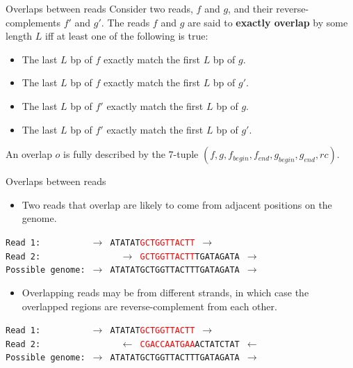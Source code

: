 \documentclass[xcolor=dvipsnames]{beamer}
\newcommand{\LengthVar}{L}
\begin{document}
\begin{frame}{Overlaps between reads}
	Consider two reads, $f$ and $g$, and their reverse-complements $f'$ and $g'$.
	The reads $f$ and $g$ are said to {\bf exactly overlap} by some length
	$\LengthVar$ iff at least one of the following is true:
	\begin{itemize}
		\item The last $\LengthVar$ bp of $f$ exactly match the first
		$\LengthVar$ bp of $g$.
		\item The last $\LengthVar$ bp of $f$ exactly match the first
		$\LengthVar$ bp of $g'$.
		\item The last $\LengthVar$ bp of $f'$ exactly match the first
		$\LengthVar$ bp of $g$.
		\item The last $\LengthVar$ bp of $f'$ exactly match the first
		$\LengthVar$ bp of $g'$.
	\end{itemize}
	An overlap $o$ is fully described by the 7-tuple $(f, g, f_{begin}, f_{end},
	g_{begin}, g_{end}, rc)$.
\end{frame}

\begin{frame}{Overlaps between reads}

	\begin{itemize}
	\item Two reads that overlap are likely to come from adjacent positions on the genome.
	\end{itemize}

	{\tt Read 1: \ \ \ \ \ \ \ \ \ $\rightarrow$
		ATATAT\textcolor{red}{GCTGGTTACTT} $\rightarrow$ } \\
	{\tt Read 2: \ \ \ \ \ \ \ \ \ \ \ \ \ \ \ $\rightarrow$
		\textcolor{red}{GCTGGTTACTT}TGATAGATA $\rightarrow$ } \\
	{\tt Possible genome: $\rightarrow$ ATATATGCTGGTTACTTTGATAGATA $\rightarrow$}

	\begin{itemize}
	\item Overlapping reads may be from different strands, in which case the
	overlapped regions are reverse-complement from each other.
	\end{itemize}

	{\tt Read 1: \ \ \ \ \ \ \ \ \ $\rightarrow$
		ATATAT\textcolor{red}{GCTGGTTACTT} $\rightarrow$ } \\
	{\tt Read 2: \ \ \ \ \ \ \ \ \ \ \ \ \ \ \ $\leftarrow$
		\textcolor{red}{CGACCAATGAA}ACTATCTAT $\leftarrow$ } \\
	{\tt Possible genome: $\rightarrow$ ATATATGCTGGTTACTTTGATAGATA $\rightarrow$}
\end{frame}
\end{document}
